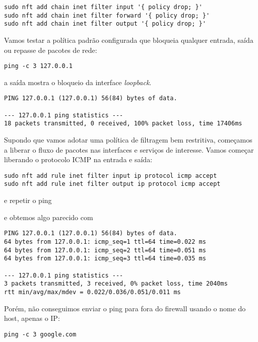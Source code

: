 \begin{lstlisting}
sudo nft add chain inet filter input '{ policy drop; }'
sudo nft add chain inet filter forward '{ policy drop; }'
sudo nft add chain inet filter output '{ policy drop; }'
\end{lstlisting}
  
Vamos testar a política padrão configurada que bloqueia qualquer
entrada, saída ou repasse de pacotes de rede:

\begin{lstlisting}
ping -c 3 127.0.0.1
\end{lstlisting}
  
\noindent a saída mostra o bloqueio da interface {\it loopback\/}.

\begin{lstlisting}
PING 127.0.0.1 (127.0.0.1) 56(84) bytes of data.

--- 127.0.0.1 ping statistics ---
18 packets transmitted, 0 received, 100% packet loss, time 17406ms
\end{lstlisting}
  
Supondo que vamos adotar uma política de filtragem bem restritiva,
começamos a liberar o fluxo de pacotes nas interfaces e serviços de
interesse. Vamos começar liberando o protocolo ICMP na entrada e
saída:

\begin{lstlisting}
sudo nft add rule inet filter input ip protocol icmp accept  
sudo nft add rule inet filter output ip protocol icmp accept
\end{lstlisting}
  
\noindent e repetir o ping
  
\noindent e obtemos algo parecido com

\begin{lstlisting}
PING 127.0.0.1 (127.0.0.1) 56(84) bytes of data.
64 bytes from 127.0.0.1: icmp_seq=1 ttl=64 time=0.022 ms
64 bytes from 127.0.0.1: icmp_seq=2 ttl=64 time=0.051 ms
64 bytes from 127.0.0.1: icmp_seq=3 ttl=64 time=0.035 ms

--- 127.0.0.1 ping statistics ---
3 packets transmitted, 3 received, 0% packet loss, time 2040ms
rtt min/avg/max/mdev = 0.022/0.036/0.051/0.011 ms
\end{lstlisting}
  
Porém, não conseguimos enviar o ping para fora do firewall usando o nome
do host, apenas o IP:

\begin{lstlisting}
ping -c 3 google.com
\end{lstlisting}
  
